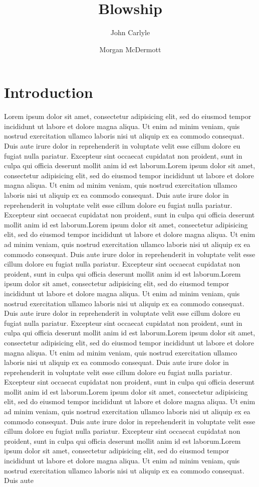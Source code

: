 \documentclass{paper}
\title{Blowship}
\author[*]{John Carlyle}
\author[**]{Morgan McDermott}
\affil[*]{University of fighitng bears}
\affil[**]{University of sillypants}
\begin{document}
\maketitle
\twocolumn
\section{Introduction}
Lorem ipsum dolor sit amet, consectetur adipisicing elit, sed do eiusmod tempor incididunt ut labore et dolore magna aliqua. Ut enim ad minim veniam, quis nostrud exercitation ullamco laboris nisi ut aliquip ex ea commodo consequat. Duis aute irure dolor in reprehenderit in voluptate velit esse cillum dolore eu fugiat nulla pariatur. Excepteur sint occaecat cupidatat non proident, sunt in culpa qui officia deserunt mollit anim id est laborum.Lorem ipsum dolor sit amet, consectetur adipisicing elit, sed do eiusmod tempor incididunt ut labore et dolore magna aliqua. Ut enim ad minim veniam, quis nostrud exercitation ullamco laboris nisi ut aliquip ex ea commodo consequat. Duis aute irure dolor in reprehenderit in voluptate velit esse cillum dolore eu fugiat nulla pariatur. Excepteur sint occaecat cupidatat non proident, sunt in culpa qui officia deserunt mollit anim id est laborum.Lorem ipsum dolor sit amet, consectetur adipisicing elit, sed do eiusmod tempor incididunt ut labore et dolore magna aliqua. Ut enim ad minim veniam, quis nostrud exercitation ullamco laboris nisi ut aliquip ex ea commodo consequat. Duis aute irure dolor in reprehenderit in voluptate velit esse cillum dolore eu fugiat nulla pariatur. Excepteur sint occaecat cupidatat non proident, sunt in culpa qui officia deserunt mollit anim id est laborum.Lorem ipsum dolor sit amet, consectetur adipisicing elit, sed do eiusmod tempor incididunt ut labore et dolore magna aliqua. Ut enim ad minim veniam, quis nostrud exercitation ullamco laboris nisi ut aliquip ex ea commodo consequat. Duis aute irure dolor in reprehenderit in voluptate velit esse cillum dolore eu fugiat nulla pariatur. Excepteur sint occaecat cupidatat non proident, sunt in culpa qui officia deserunt mollit anim id est laborum.Lorem ipsum dolor sit amet, consectetur adipisicing elit, sed do eiusmod tempor incididunt ut labore et dolore magna aliqua. Ut enim ad minim veniam, quis nostrud exercitation ullamco laboris nisi ut aliquip ex ea commodo consequat. Duis aute irure dolor in reprehenderit in voluptate velit esse cillum dolore eu fugiat nulla pariatur. Excepteur sint occaecat cupidatat non proident, sunt in culpa qui officia deserunt mollit anim id est laborum.Lorem ipsum dolor sit amet, consectetur adipisicing elit, sed do eiusmod tempor incididunt ut labore et dolore magna aliqua. Ut enim ad minim veniam, quis nostrud exercitation ullamco laboris nisi ut aliquip ex ea commodo consequat. Duis aute irure dolor in reprehenderit in voluptate velit esse cillum dolore eu fugiat nulla pariatur. Excepteur sint occaecat cupidatat non proident, sunt in culpa qui officia deserunt mollit anim id est laborum.Lorem ipsum dolor sit amet, consectetur adipisicing elit, sed do eiusmod tempor incididunt ut labore et dolore magna aliqua. Ut enim ad minim veniam, quis nostrud exercitation ullamco laboris nisi ut aliquip ex ea commodo consequat. Duis aute 
\end{document}
